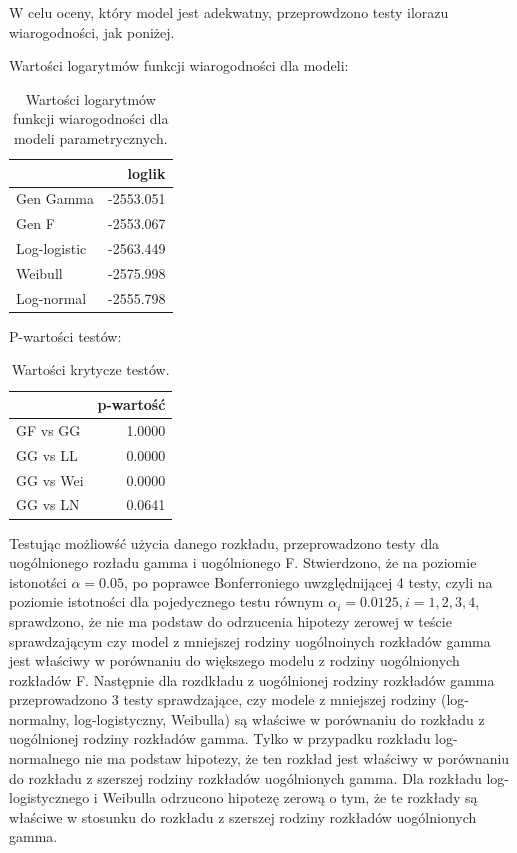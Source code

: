 \documentclass[]{article}
\begin{document}
W celu oceny, który model jest adekwatny, przeprowdzono testy ilorazu
wiarogodności, jak poniżej.

Wartości logarytmów funkcji wiarogodności dla modeli:

\begin{table}[hbt!]
\centering
\begin{tabular}{lr}
\toprule%
  & loglik\\ \toprule%

Gen Gamma & -2553.051\\

Gen F & -2553.067\\

Log-logistic & -2563.449\\

Weibull & -2575.998\\

Log-normal & -2555.798\\
\bottomrule
\end{tabular}
\caption{Wartości logarytmów funkcji wiarogodności dla modeli parametrycznych.}
\end{table}

P-wartości testów:

\begin{table}[hbt!]
\centering
\begin{tabular}{lr}
\toprule%
  & p-wartość\\
\toprule%
GF vs GG & 1.0000\\

GG vs LL & 0.0000\\

GG vs Wei & 0.0000\\

GG vs LN & 0.0641\\
\bottomrule
\end{tabular}
\caption{Wartości krytycze testów.}
\end{table}

Testując możliowść użycia danego rozkładu, przeprowadzono testy dla
uogólnionego rozładu gamma i uogólnionego F. Stwierdzono, że na poziomie
istonotści $\alpha=0.05$, po poprawce Bonferroniego uwzględnijącej 4
testy, czyli na poziomie istotności dla pojedycznego testu równym
$\alpha_i = 0.0125, i =1,2,3,4$, sprawdzono, że nie ma podstaw do
odrzucenia hipotezy zerowej w teście sprawdzającym czy model z mniejszej
rodziny uogólnoinych rozkładów gamma jest właściwy w porównaniu do
większego modelu z rodziny uogólnionych rozkładów F. Następnie dla
rozdkładu z uogólnionej rodziny rozkładów gamma przeprowadzono 3 testy
sprawdzające, czy modele z mniejszej rodziny (log-normalny,
log-logistyczny, Weibulla) są właściwe w porównaniu do rozkładu z
uogólnionej rodziny rozkładów gamma. Tylko w przypadku rozkładu
log-normalnego nie ma podstaw  hipotezy, że ten
rozkład jest właściwy w porównaniu do rozkładu z szerszej rodziny
rozkładów uogólnionych gamma. Dla rozkładu log-logistycznego i Weibulla
odrzucono hipotezę zerową o tym, że te rozkłady są właściwe w stosunku
do rozkładu z szerszej rodziny rozkładów uogólnionych gamma.
\end{document}

